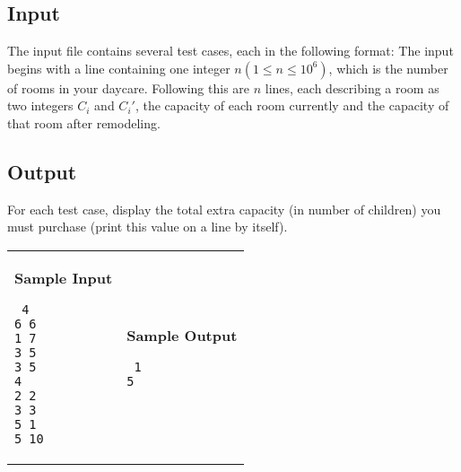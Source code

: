 \documentclass[11pt]{article}
\begin{document}
\subsection*{Input}

The input file contains several test cases, each in the following format: The input begins with a line containing one integer $n (1 \leq n \leq 10^6)$, which is the number of rooms in your daycare. Following this are $n$ lines, each describing a room as two integers $C_i$ and $C_i'$, the capacity of each room currently and the capacity of that room after remodeling.

\subsection*{Output}

For each test case, display the total extra capacity (in number of children) you must purchase (print this value on a line by itself).


\vspace{0.25in}\hspace{-0.3in}\begin{tabular}{ll}

\parbox{3in}{{\large\bf Sample Input}

\vspace{0.15in}

{\tt 
4		\\
6 6		\\
1 7		\\
3 5		\\
3 5		\\
4		\\
2 2		\\
3 3		\\
5 1		\\
5 10
}
}

&

\parbox{3in}{{\large\bf Sample Output}

\vspace{0.15in}

{\tt
1		\\
5
}


}

\\
\end{tabular}
\end{document}
